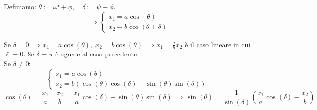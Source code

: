 Definiamo: $\theta:=\omega t + \phi, \quad\delta:=\psi-\phi$.
\begin{equation}
    \implies \begin{cases}
        x_1 = a\cos(\theta)\\
        x_2 = b\cos(\theta+\delta)
    \end{cases}
\end{equation}

Se $\delta=0\implies x_1= a\cos(\theta),\;x_2=b\cos(\theta)\implies x_1=\frac{a}{b}x_2$ è il caso lineare in cui $\ell = 0$.
Se $\delta= \pi$ è uguale al caso precedente.\\
Se $\delta\neq 0$:
\begin{equation*}
    \begin{cases}
        x_1 = a\cos(\theta)\\
        x_2 = b(\cos(\theta)\cos(\delta)-\sin(\theta)\sin(\delta))
    \end{cases}
\end{equation*}
\begin{equation}
    \cos(\theta)=\frac{x_1}{a} \quad \frac{x_2}{b}= \frac{x_1}{a}\cos(\delta)-\sin(\theta)\sin(\delta)\implies
    \sin(\theta)= \frac{1}{\sin(\delta)}\left(  \frac{x_1}{a}\cos(\delta)-\frac{x_2}{b}\right)
\end{equation}


